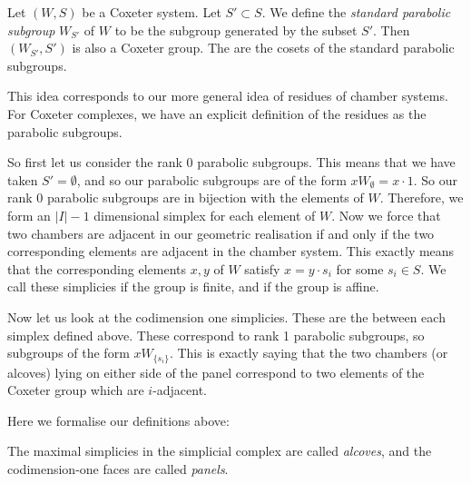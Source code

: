 \documentclass[11pt]{article}
\begin{document}
\begin{definition}
    Let $(W,S)$ be a Coxeter system. Let $S'\subset S$. We define the \textit{standard parabolic subgroup} $W_{S'}$ of $W$ to be the subgroup generated by the subset $S'$. Then $(W_{S'},S')$ is also a Coxeter group. The  are the cosets of the standard parabolic subgroups. 
\end{definition}

This idea corresponds to our more general idea of residues of chamber systems. For Coxeter complexes, we have an explicit definition of the residues as the parabolic subgroups. 

So first let us consider the rank 0 parabolic subgroups. This means that we have taken $S'=\emptyset$, and so our parabolic subgroups are of the form $xW_\emptyset=x\cdot{1}$. So our rank 0 parabolic subgroups are in bijection with the elements of $W$. Therefore, we form an $|I|-1$ dimensional simplex for each element of $W$. Now we force that two chambers are adjacent in our geometric realisation if and only if the two corresponding elements are adjacent in the chamber system. This exactly means that the corresponding elements $x,y$ of $W$ satisfy $x=y\cdot s_i$ for some $s_i\in S$. We call these simplicies  if the group is finite, and  if the group is affine.

Now let us look at the codimension one simplicies. These are the  between each simplex defined above. These correspond to rank 1 parabolic subgroups, so subgroups of the form $xW_{\{s_i\}}$. This is exactly saying that the two chambers (or alcoves) lying on either side of the panel correspond to two elements of the Coxeter group which are $i$-adjacent. 




Here we formalise our definitions above:

\begin{definition}
    The maximal simplicies in the simplicial complex are called \textit{alcoves}, and the codimension-one faces are called \textit{panels}.  
\end{definition}
\end{document}
